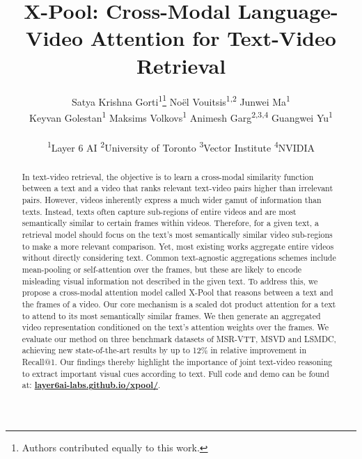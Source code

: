 \documentclass[10pt,twocolumn,letterpaper]{article}
\begin{document}
\def \ModelName {X-Pool}

\title{\ModelName{}: Cross-Modal Language-Video Attention for Text-Video Retrieval}



\author{Satya Krishna Gorti\textsuperscript{1}\thanks{Authors contributed equally to this work.} \hspace{1cm} Noël Vouitsis\textsuperscript{1,2}\footnotemark[1] \hspace{1cm} Junwei Ma\textsuperscript{1}\footnotemark[1]\\
Keyvan Golestan\textsuperscript{1} \hspace{1cm} Maksims Volkovs\textsuperscript{1} \hspace{1cm} Animesh Garg\textsuperscript{2,3,4} \hspace{1cm} Guangwei Yu\textsuperscript{1}\\\\
\textsuperscript{1}Layer 6 AI \hspace{0.25cm} \textsuperscript{2}University of Toronto \hspace{0.25cm} \textsuperscript{3}Vector Institute \hspace{0.25cm} \textsuperscript{4}NVIDIA\\
}

\maketitle

\begin{abstract}
In text-video retrieval, the objective is to learn a cross-modal similarity function between a text and a video that ranks relevant text-video pairs higher than irrelevant pairs. However, videos inherently express a much wider gamut of information than texts. Instead, texts often capture sub-regions of entire videos and are most semantically similar to certain frames within videos.
Therefore, for a given text, a retrieval model should focus on the text's most semantically similar video sub-regions to make a more relevant comparison. Yet, most existing works aggregate entire videos without directly considering text. Common text-agnostic aggregations schemes include mean-pooling or self-attention over the frames, but these are likely to encode misleading visual information not described in the given text. To address this, we propose a cross-modal attention model called \ModelName{} that reasons between a text and the frames of a video. Our core mechanism is a scaled dot product attention for a text to attend to its most semantically similar frames. We then generate an aggregated video representation conditioned on the text's attention weights over the frames. We evaluate our method on three benchmark datasets of MSR-VTT, MSVD and LSMDC, achieving new state-of-the-art results by up to 12\% in relative improvement in Recall@1. Our findings thereby highlight the importance of joint text-video reasoning to extract important visual cues according to text. Full code and demo can be found at: \href{https://layer6ai-labs.github.io/xpool/}{\textbf{layer6ai-labs.github.io/xpool/}}.

\end{abstract}
\end{document}
